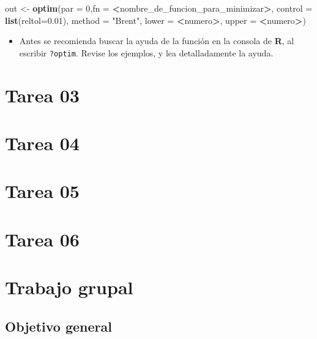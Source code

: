 \documentclass[12pt,letterpaper,]{book}
\newenvironment{Shaded}{\begin{snugshade}}{\end{snugshade}}
\newcommand{\KeywordTok}[1]{\textcolor[rgb]{0.13,0.29,0.53}{\textbf{#1}}}
\newcommand{\DataTypeTok}[1]{\textcolor[rgb]{0.13,0.29,0.53}{#1}}
\newcommand{\DecValTok}[1]{\textcolor[rgb]{0.00,0.00,0.81}{#1}}
\newcommand{\FloatTok}[1]{\textcolor[rgb]{0.00,0.00,0.81}{#1}}
\newcommand{\StringTok}[1]{\textcolor[rgb]{0.31,0.60,0.02}{#1}}
\newcommand{\OperatorTok}[1]{\textcolor[rgb]{0.81,0.36,0.00}{\textbf{#1}}}
\newcommand{\NormalTok}[1]{#1}
\providecommand{\tightlist}{%
  \setlength{\itemsep}{0pt}\setlength{\parskip}{0pt}}
\begin{document}
\begin{Shaded}
\begin{Highlighting}[]
\NormalTok{out <-}\StringTok{ }\KeywordTok{optim}\NormalTok{(}\DataTypeTok{par =} \DecValTok{0}\NormalTok{,}\DataTypeTok{fn =} \OperatorTok{<}\NormalTok{nombre_de_funcion_para_minimizar}\OperatorTok{>}\NormalTok{,}
      \DataTypeTok{control =} \KeywordTok{list}\NormalTok{(}\DataTypeTok{reltol=}\FloatTok{0.01}\NormalTok{),}
      \DataTypeTok{method =} \StringTok{"Brent"}\NormalTok{, }
      \DataTypeTok{lower =} \OperatorTok{<}\NormalTok{numero}\OperatorTok{>}\NormalTok{, }
      \DataTypeTok{upper =} \OperatorTok{<}\NormalTok{numero}\OperatorTok{>}\NormalTok{)}
\end{Highlighting}
\end{Shaded}

\begin{itemize}
\tightlist
\item
  Antes se recomienda buscar la ayuda de la función en la consola de
  \textbf{R}, al escribir \texttt{?optim}. Revise los ejemplos, y lea
  detalladamente la ayuda.
\end{itemize}

\section{Tarea 03}\label{tarea-03}

\section{Tarea 04}\label{tarea-04}

\section{Tarea 05}\label{tarea-05}

\section{Tarea 06}\label{tarea-06}

\newpage

\section{Trabajo grupal}\label{trabajo-grupal}

\subsection{Objetivo general}\label{objetivo-general}
\end{document}
